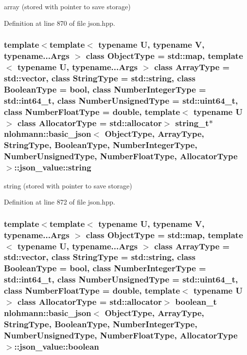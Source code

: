 array (stored with pointer to save storage) 



Definition at line 870 of file json.\+hpp.

\hypertarget{unionnlohmann_1_1basic__json_1_1json__value_ace24e73a98da65dc70b659b63370c953}{}
\subsubsection[{string}]{\setlength{\rightskip}{0pt plus 5cm}template$<$template$<$ typename U, typename V, typename...\+Args $>$ class Object\+Type = std\+::map, template$<$ typename U, typename...\+Args $>$ class Array\+Type = std\+::vector, class String\+Type  = std\+::string, class Boolean\+Type  = bool, class Number\+Integer\+Type  = std\+::int64\+\_\+t, class Number\+Unsigned\+Type  = std\+::uint64\+\_\+t, class Number\+Float\+Type  = double, template$<$ typename U $>$ class Allocator\+Type = std\+::allocator$>$ {\bf string\+\_\+t}$\ast$ {\bf nlohmann\+::basic\+\_\+json}$<$ Object\+Type, Array\+Type, String\+Type, Boolean\+Type, Number\+Integer\+Type, Number\+Unsigned\+Type, Number\+Float\+Type, Allocator\+Type $>$\+::json\+\_\+value\+::string}\label{unionnlohmann_1_1basic__json_1_1json__value_ace24e73a98da65dc70b659b63370c953}


string (stored with pointer to save storage) 



Definition at line 872 of file json.\+hpp.

\hypertarget{unionnlohmann_1_1basic__json_1_1json__value_a786fdeafc80b53fc649ee4730b392bb7}{}
\subsubsection[{boolean}]{\setlength{\rightskip}{0pt plus 5cm}template$<$template$<$ typename U, typename V, typename...\+Args $>$ class Object\+Type = std\+::map, template$<$ typename U, typename...\+Args $>$ class Array\+Type = std\+::vector, class String\+Type  = std\+::string, class Boolean\+Type  = bool, class Number\+Integer\+Type  = std\+::int64\+\_\+t, class Number\+Unsigned\+Type  = std\+::uint64\+\_\+t, class Number\+Float\+Type  = double, template$<$ typename U $>$ class Allocator\+Type = std\+::allocator$>$ {\bf boolean\+\_\+t} {\bf nlohmann\+::basic\+\_\+json}$<$ Object\+Type, Array\+Type, String\+Type, Boolean\+Type, Number\+Integer\+Type, Number\+Unsigned\+Type, Number\+Float\+Type, Allocator\+Type $>$\+::json\+\_\+value\+::boolean}\label{unionnlohmann_1_1basic__json_1_1json__value_a786fdeafc80b53fc649ee4730b392bb7}


